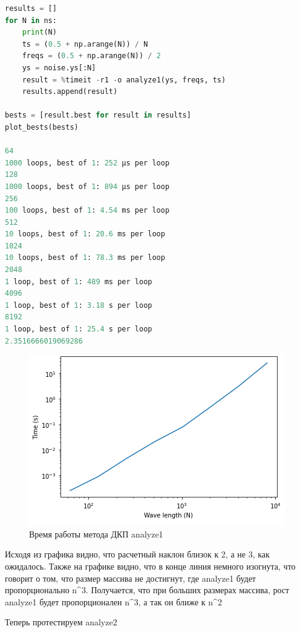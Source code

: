 \begin{lstlisting}[language=Python]
results = []
for N in ns:
    print(N)
    ts = (0.5 + np.arange(N)) / N
    freqs = (0.5 + np.arange(N)) / 2
    ys = noise.ys[:N]
    result = %timeit -r1 -o analyze1(ys, freqs, ts)
    results.append(result)

bests = [result.best for result in results]
plot_bests(bests)

64
1000 loops, best of 1: 252 µs per loop
128
1000 loops, best of 1: 894 µs per loop
256
100 loops, best of 1: 4.54 ms per loop
512
10 loops, best of 1: 20.6 ms per loop
1024
10 loops, best of 1: 78.3 ms per loop
2048
1 loop, best of 1: 489 ms per loop
4096
1 loop, best of 1: 3.18 s per loop
8192
1 loop, best of 1: 25.4 s per loop
2.3516666019069286
\end{lstlisting}

\begin{figure}[H]
	\begin{center}
		\includegraphics[scale=1]{fig/lab06/lab06_01.png}
		\caption{Время работы метода ДКП analyze1}
	\end{center}
\end{figure}

Исходя из графика видно, что расчетный наклон близок к 2, а не 3, как ожидалось. Также на графике видно, что в конце линия немного изогнута, что говорит о том, что размер массива не достигнут, где analyze1 будет пропорционально n^3. Получается, что при больших размерах массива, рост analyze1 будет пропорционален n^3, а так он ближе к n^2

Теперь протестируем analyze2

